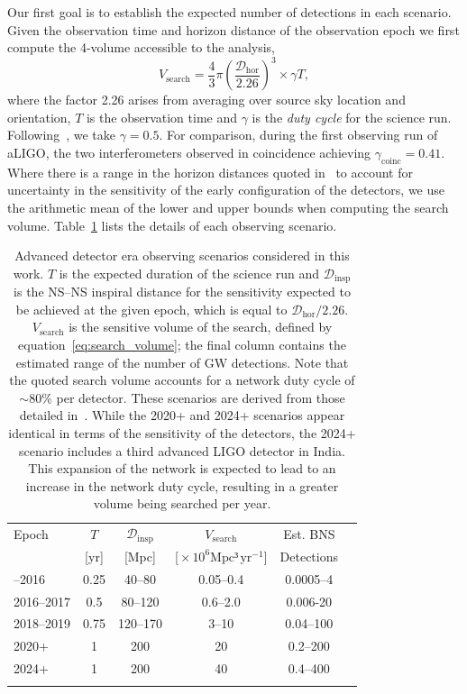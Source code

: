 \documentclass[twocolumn]{aastex61}
\newcommand{\ee}[1]{\ensuremath{\!\times\!10^{#1}}}
\newcommand{\dhor}{\ensuremath{{\mathcal D}_{\mathrm{hor}}}}
\newcommand{\dinsp}{\ensuremath{{\mathcal D}_{\mathrm{insp}}}}
\newcommand{\mpc}{\mathrm{Mpc}}
\newcommand{\yr}{\mathrm{yr}}
\newcommand{\BNS}{\ac{NS}--\ac{NS}\xspace}
\begin{document}
Our first goal is to establish the expected number of detections in
each scenario.  Given the observation time and horizon distance of the
observation epoch we first compute the 4-volume accessible to the
analysis,
%
\begin{equation}
    \label{eq:search_volume}
    V_{\mathrm{search}} = \frac{4}{3}\pi \left(\frac{\dhor}{2.26}\right)^3 \times \gamma T,
\end{equation}
%
where the factor 2.26 arises from averaging over source sky location
and orientation, $T$ is the observation time and $\gamma$ is the
\emph{duty cycle} for the science run.  Following~\cite{Aasi:2013wya},
we take $\gamma=0.5$.  For comparison, during the first observing run
of \ac{aLIGO}, the two interferometers observed in coincidence
achieving $\gamma_{\mathrm{coinc}} = 0.41$.  Where there is a range in
the horizon distances quoted in~\cite{Aasi:2013wya} to account for
uncertainty in the sensitivity of the early configuration of the
detectors, we use the arithmetic mean of the lower and upper bounds
when computing the search volume.  Table~\ref{tab:scenarios} lists
the details of each observing scenario.
%
\begin{table}
\centering
\begin{tabular}{lccccc}
  \toprule
  Epoch &  $T$ & \dinsp & $V_{\mathrm{search}}$ & Est. BNS \\
        &   [yr] & [Mpc] & [$\ee{6} \mpc³\,\yr^{-1}$] & Detections \\
  \colrule
  2015--2016 & 0.25 & 40--80   & 0.05--0.4 & 0.0005--4 \\
  2016--2017 & 0.5 & 80--120 & 0.6--2.0 & 0.006-20\\
  2018--2019 & 0.75 & 120--170 & 3--10 & 0.04--100\\
  2020+      & 1    & 200 & 20 & 0.2--200 \\
  2024+      & 1    & 200 & 40 & 0.4--400 \\
  \botrule
\end{tabular}
\caption{Advanced detector era observing scenarios considered in this
  work.  $T$ is the expected duration of the science run and $\dinsp$
  is the \BNS inspiral distance for the sensitivity expected to be
  achieved at the given epoch, which is equal to $\dhor / 2.26$.
  $V_{\mathrm{search}}$ is the sensitive volume of the search, defined
  by equation~\ref{eq:search_volume}; the final column contains the
  estimated range of the number of \ac{GW} detections.  Note that the
  quoted search volume accounts for a network duty cycle of
  $\sim 80\%$ per detector.  These scenarios are derived from those detailed
  in~\cite{Aasi:2013wya}. While the 2020+ and 2024+ scenarios appear
  identical in terms of the sensitivity of the detectors, the 2024+
  scenario includes a third advanced LIGO detector in India. This
  expansion of the network is expected to lead to an increase in the
  network duty cycle, resulting in a greater volume being searched per
  year.
  \label{tab:scenarios}}
\end{table}
%
\end{document}
